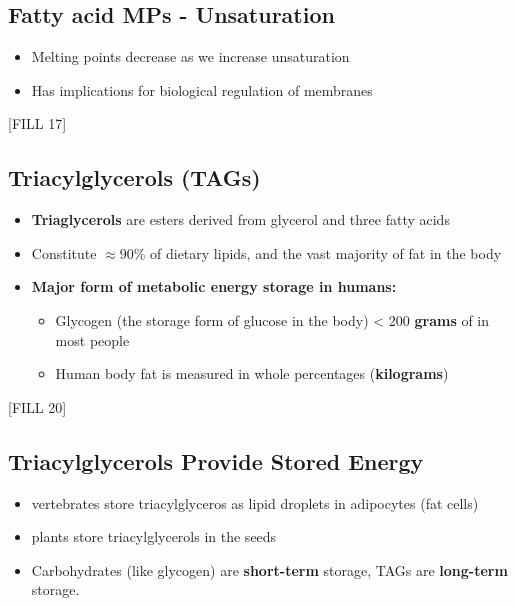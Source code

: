 \documentclass[10pt]{article}
\begin{document}
\subsection*{Fatty acid MPs - Unsaturation}
\begin{itemize}
    \item Melting points decrease as we increase unsaturation
    \item Has implications for biological regulation of membranes
\end{itemize}
\begin{center}
    [FILL 17]
\end{center}

\subsection*{Triacylglycerols (TAGs)}
\begin{itemize}
    \item \textbf{Triaglycerols} are esters derived from glycerol and three fatty acids
    \item Constitute $\approx 90\%$ of dietary lipids, and the vast majority of fat in the body
    \item \textbf{Major form of metabolic energy storage in humans:}
    \begin{itemize}
        \item Glycogen (the storage form of glucose in the body) < 200 \textbf{grams} of in most people 
        \item Human body fat is measured in whole percentages (\textbf{kilograms})
    \end{itemize}
\end{itemize}
\begin{center}
    [FILL 20]
\end{center}

\subsection*{Triacylglycerols Provide Stored Energy}
\begin{itemize}
    \item vertebrates store triacylglyceros as lipid droplets in adipocytes (fat cells)
    \item plants store triacylglycerols in the seeds
    \item Carbohydrates (like glycogen) are \textbf{short-term} storage, TAGs are \textbf{long-term} storage.
\end{itemize}
\end{document}
